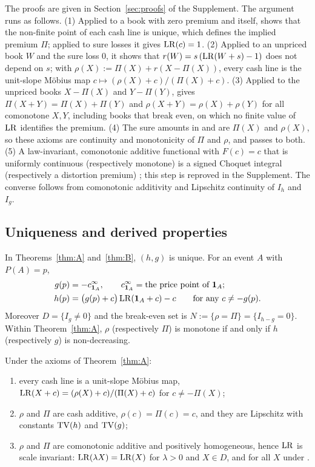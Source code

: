 The proofs are given in Section~\ref{sec:proofs} of the Supplement. The argument runs as follows. (1) Applied to a
book with zero premium and itself, \axR{} shows that the non-finite point of each cash line is unique, which defines
the implied premium $\Pi$; applied to sure losses it gives $\mathrm{LR}(c)=1$. (2) Applied to an unpriced book $W$ and the
sure loss $0$, it shows that $r(W)=s\,(\mathrm{LR}(W+s)-1)$ does not depend on $s$; with $\rho(X):=\Pi(X)+r(X-\Pi(X))$,
every cash line is the unit-slope Möbius map $c\mapsto(\rho(X)+c)/(\Pi(X)+c)$. (3) Applied to the unpriced books
$X-\Pi(X)$ and $Y-\Pi(Y)$, \axR{} gives $\Pi(X+Y)=\Pi(X)+\Pi(Y)$ and $\rho(X+Y)=\rho(X)+\rho(Y)$ for all comonotone
$X,Y$, including books that break even, on which no finite value of $\mathrm{LR}$ identifies the premium. (4) The sure
amounts in \axRC{} and \axRM{} are $\Pi(X)$ and $\rho(X)$, so these axioms are continuity and monotonicity of $\Pi$
and $\rho$, and \axLI{} passes to both. (5) A law-invariant, comonotonic additive functional with $F(c)=c$ that is
uniformly continuous (respectively monotone) is a signed Choquet integral (respectively a distortion premium)
\citep{www2020,wyp1997}; this step is reproved in the Supplement. The converse follows from comonotonic additivity
and Lipschitz continuity of $I_h$ and $I_g$.

\subsection{Uniqueness and derived properties}

\begin{proposition}\label{prop:unique}
In Theorems~\ref{thm:A} and~\ref{thm:B}, $(h,g)$ is unique. For an event $A$ with $P(A)=p$,
\begin{align*}
 g(p)&=-c^{\infty}_{\mathbf 1_A},\qquad c^{\infty}_{\mathbf 1_A}=\text{the price point of }\mathbf 1_A;\\
 h(p)&=\big(g(p)+c\big)\,\mathrm{LR}(\mathbf 1_A+c)-c\qquad\text{for any }c\neq-g(p).
\end{align*}
Moreover $D=\{I_g\ne0\}$ and the break-even set is $N:=\{\rho=\Pi\}=\{I_{h-g}=0\}$. Within
Theorem~\ref{thm:A}, $\rho$ (respectively $\Pi$) is monotone if and only if $h$ (respectively $g$) is
non-decreasing.
\end{proposition}

\begin{proposition}\label{prop:derived}
Under the axioms of Theorem~\ref{thm:A}:
\begin{enumerate}[label=(\roman*),nosep]
\item every cash line is a unit-slope Möbius map, $\mathrm{LR}(X+c)=(\rho(X)+c)/(\Pi(X)+c)$ for $c\ne-\Pi(X)$;
\item $\rho$ and $\Pi$ are cash additive, $\rho(c)=\Pi(c)=c$, and they are Lipschitz with constants
  $\mathrm{TV}(h)$ and $\mathrm{TV}(g)$;
\item $\rho$ and $\Pi$ are comonotonic additive and positively homogeneous, hence $\mathrm{LR}$ is scale invariant:
  $\mathrm{LR}(\lambda X)=\mathrm{LR}(X)$ for $\lambda>0$ and $X\in D$, and for all $X$ under .
\end{enumerate}
\end{proposition}

